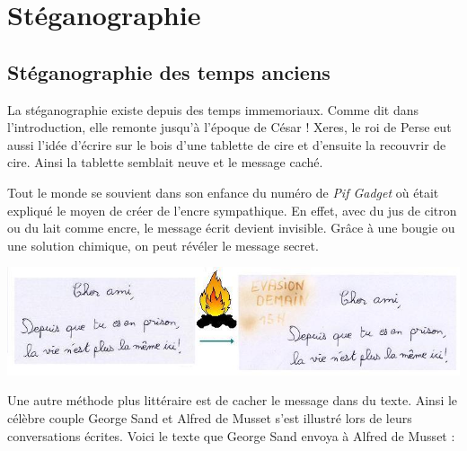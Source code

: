 \documentclass[a4paper,12pt]{article}
\begin{document}
\section{Stéganographie}

\subsection{Stéganographie des temps anciens}

La stéganographie existe depuis des temps immemoriaux. Comme dit dans l'introduction, elle remonte jusqu'à l'époque de César ! Xeres, le roi de Perse eut aussi l'idée d'écrire sur le bois d'une tablette de cire et d'ensuite la recouvrir de cire. Ainsi la tablette semblait neuve et le message caché.

Tout le monde se souvient dans son enfance du numéro de \emph{Pif Gadget} où était expliqué le moyen de créer de l'encre sympathique. En effet, avec du jus de citron ou du lait comme encre, le message écrit devient invisible. Grâce à une bougie ou une solution chimique, on peut révéler le message secret.

\begin{center}
  \includegraphics[width=\textwidth]{../Image/histegano1.jpg}
\end{center}

Une  autre méthode  plus littéraire est de cacher le message dans du texte. Ainsi le célèbre couple George Sand et Alfred de Musset s'est illustré lors de leurs conversations écrites. Voici le texte que George Sand envoya à Alfred de Musset :
\end{document}
